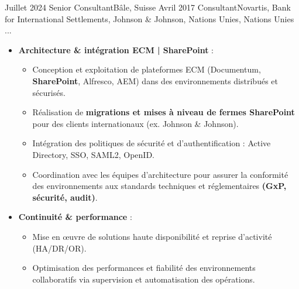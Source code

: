 %
%
%

\begin{experiences}

\consultantexperience
    {Juillet 2024} {Senior Consultant}{}{Bâle, Suisse}
    {Avril 2017}    {Consultant}{Novartis, Bank for International Settlements, Johnson \& Johnson, Nations Unies, Nations Unies ...} {
        \begin{itemize}[left=0pt,label={},itemsep=0.5em]
        \vspace{0.3em}  %
          \item \textbf{Architecture \& intégration ECM | SharePoint} :
            \begin{itemize}[itemsep=0.2em,topsep=0.2em,parsep=0pt]
              \small
              \item Conception et exploitation de plateformes ECM (Documentum, \textbf{SharePoint}, Alfresco, AEM) dans des environnements distribués et sécurisés.
              \item Réalisation de \textbf{migrations et mises à niveau de fermes SharePoint} pour des clients internationaux (ex. Johnson \& Johnson).
              \item Intégration des politiques de sécurité et d’authentification : Active Directory, SSO, SAML2, OpenID.
              \item Coordination avec les équipes d’architecture pour assurer la conformité des environnements aux standards techniques et réglementaires \textbf{(GxP, sécurité, audit)}.
            \end{itemize}
            \vspace{0.1em}
          \item \textbf{Continuité \& performance} :
            \begin{itemize}[itemsep=0.2em,topsep=0.2em,parsep=0pt]
              \small
              \item Mise en œuvre de solutions haute disponibilité et reprise d’activité (HA/DR/OR).
              \item Optimisation des performances et fiabilité des environnements collaboratifs via supervision et automatisation des opérations.

\end{itemize}
\end{itemize}}
\end{experiences}
